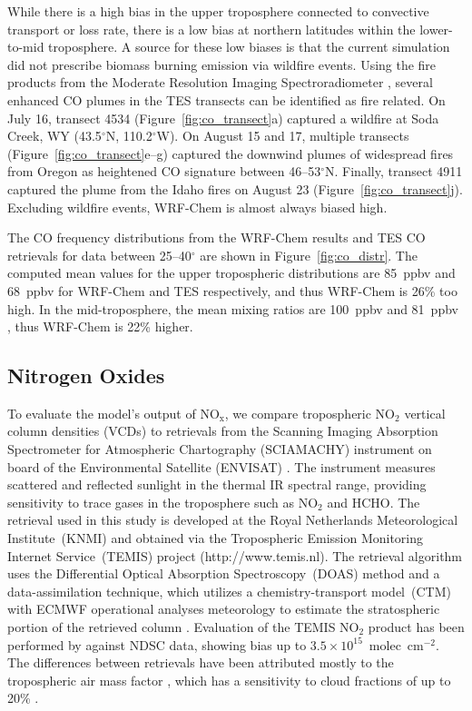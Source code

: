 While there is a high bias in the upper troposphere connected to convective transport
or loss rate, there is a low bias at northern latitudes within the lower-to-mid troposphere.
A source for these low biases is that the current simulation did not prescribe biomass
burning emission via wildfire events. Using the fire products from the Moderate
Resolution Imaging Spectroradiometer \citep[MODIS;][]{Justice:2002zr}, several
enhanced CO plumes in the TES transects can be identified as fire related. On July
16, transect 4534 (Figure~\ref{fig:co_transect}a) captured a wildfire at Soda Creek, WY
(43.5$^\circ$N, 110.2$^\circ$W). On August 15 and 17, multiple transects
(Figure~\ref{fig:co_transect}e--g) captured the downwind plumes of widespread fires from
Oregon as heightened CO signature between 46--53$^\circ$N. Finally, transect
4911 captured the plume from the Idaho fires on August 23 (Figure~\ref{fig:co_transect}j).
Excluding wildfire events, WRF-Chem is almost always biased high.

The CO frequency distributions from the WRF-Chem results and TES CO retrievals for data
between 25--40$^\circ$ are shown in Figure~\ref{fig:co_distr}. The computed
mean values for the upper tropospheric distributions are 85~ppbv and 68~ppbv for
WRF-Chem and TES respectively, and thus WRF-Chem is 26\% too high.
In the mid-troposphere, the mean mixing ratios are 100~ppbv and 81~ppbv , thus
WRF-Chem is 22\% higher.

\subsection{Nitrogen Oxides}\label{sect:val/nox}

To evaluate the model's output of NO$_{\mathrm{x}}$, we compare tropospheric NO$_2$
vertical column densities (VCDs) to retrievals from the Scanning Imaging Absorption
Spectrometer for Atmospheric Chartography (SCIAMACHY) instrument on board of the
Environmental Satellite (ENVISAT) \citep{Burrows:1995fk,Bovensmann:1999uq}. The
instrument measures scattered and reflected sunlight in the thermal IR spectral range,
providing sensitivity to trace gases in the troposphere such as NO$_2$ and HCHO. The
retrieval used in this study is developed at the Royal Netherlands Meteorological
Institute~(KNMI) and obtained via the Tropospheric Emission Monitoring Internet
Service~(TEMIS) project (http://www.temis.nl). The retrieval algorithm uses the Differential
Optical Absorption Spectroscopy~(DOAS) method and a data-assimilation technique,
which utilizes a chemistry-transport model~(CTM) with ECMWF operational analyses
meteorology to estimate the stratospheric portion of the retrieved column
\citep{Boersma:2004uq}. Evaluation of the TEMIS NO$_2$ product has been performed
by \citet{Lambert:2004aa} against NDSC data, showing bias up to
$3.5\times10^{15}$~molec~cm$^{-2}$. The differences between retrievals have been
attributed mostly to the tropospheric air mass factor \citep{vanderA:2010aa}, which has
a sensitivity to cloud fractions of up to 20\% \citep{Boersma:2004uq}.

